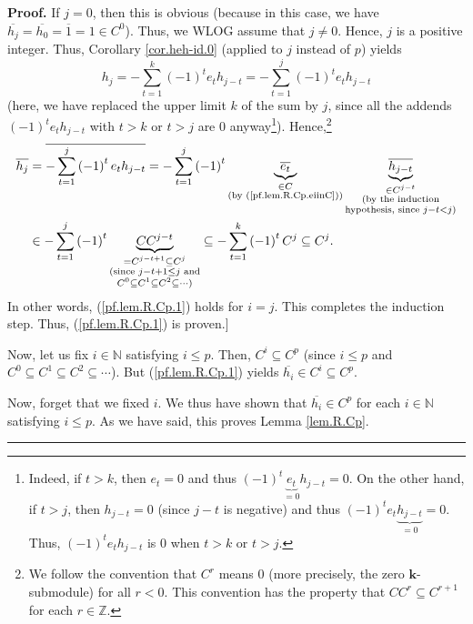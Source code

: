 \documentclass[numbers=enddot,12pt,final,onecolumn,notitlepage]{scrartcl}%
\theoremstyle{definition}
\newenvironment{proof}[1][Proof]{\noindent\textbf{#1.} }{\ \rule{0.5em}{0.5em}}
\let\sumnonlimits\sum
\renewcommand{\sum}{\sumnonlimits\limits}
\begin{document}
\begin{proof}
If $j=0$, then this is obvious (because in this case, we have $\overline
{h_{j}}=\overline{h_{0}}=\overline{1}=1\in C^{0}$). Thus, we WLOG assume that
$j\neq0$. Hence, $j$ is a positive integer. Thus, Corollary \ref{cor.heh-id.0}
(applied to $j$ instead of $p$) yields%
\[
h_{j}=-\sum_{t=1}^{k}\left(  -1\right)  ^{t}e_{t}h_{j-t}=-\sum_{t=1}%
^{j}\left(  -1\right)  ^{t}e_{t}h_{j-t}%
\]
(here, we have replaced the upper limit $k$ of the sum by $j$, since all the
addends $\left(  -1\right)  ^{t}e_{t}h_{j-t}$ with $t>k$ or $t>j$ are $0$
anyway\footnote{Indeed, if $t>k$, then $e_{t}=0$ and thus $\left(  -1\right)
^{t}\underbrace{e_{t}}_{=0}h_{j-t}=0$. On the other hand, if $t>j$, then
$h_{j-t}=0$ (since $j-t$ is negative) and thus $\left(  -1\right)  ^{t}%
e_{t}\underbrace{h_{j-t}}_{=0}=0$. Thus, $\left(  -1\right)  ^{t}e_{t}h_{j-t}$
is $0$ when $t>k$ or $t>j$.}). Hence,\footnote{We follow the convention that
$C^{r}$ means $0$ (more precisely, the zero $\mathbf{k}$-submodule) for all
$r<0$. This convention has the property that $CC^{r}\subseteq C^{r+1}$ for
each $r\in\mathbb{Z}$.}%
\begin{align*}
\overline{h_{j}} &  =\overline{-\sum_{t=1}^{j}\left(  -1\right)  ^{t}%
e_{t}h_{j-t}}=-\sum_{t=1}^{j}\left(  -1\right)  ^{t}\underbrace{\overline
{e_{t}}}_{\substack{\in C\\\text{(by (\ref{pf.lem.R.Cp.eiinC}))}%
}}\underbrace{\overline{h_{j-t}}}_{\substack{\in C^{j-t}\\\text{(by the
induction}\\\text{hypothesis, since }j-t<j\text{)}}}\\
&  \in-\sum_{t=1}^{j}\left(  -1\right)  ^{t}\underbrace{CC^{j-t}%
}_{\substack{=C^{j-t+1}\subseteq C^{j}\\\text{(since }j-t+1\leq j\text{
and}\\C^{0}\subseteq C^{1}\subseteq C^{2}\subseteq\cdots\text{)}}%
}\subseteq-\sum_{t=1}^{k}\left(  -1\right)  ^{t}C^{j}\subseteq C^{j}.
\end{align*}
In other words, (\ref{pf.lem.R.Cp.1}) holds for $i=j$. This completes the
induction step. Thus, (\ref{pf.lem.R.Cp.1}) is proven.]

Now, let us fix $i\in\mathbb{N}$ satisfying $i\leq p$. Then, $C^{i}\subseteq
C^{p}$ (since $i\leq p$ and $C^{0}\subseteq C^{1}\subseteq C^{2}%
\subseteq\cdots$). But (\ref{pf.lem.R.Cp.1}) yields $\overline{h_{i}}\in
C^{i}\subseteq C^{p}$.

Now, forget that we fixed $i$. We thus have shown that $\overline{h_{i}}\in
C^{p}$ for each $i\in\mathbb{N}$ satisfying $i\leq p$. As we have said, this
proves Lemma \ref{lem.R.Cp}.
\end{proof}
\end{document}
